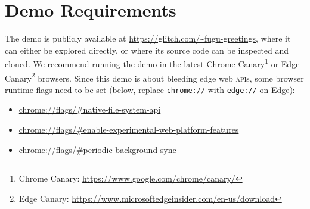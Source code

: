 \documentclass[sigconf]{acmart}
\begin{document}



\appendix

\section{Demo Requirements}

The demo is publicly available at \url{https://glitch.com/~fugu-greetings},
where it can either be explored directly,
or where its source code can be inspected and cloned.
We recommend running the demo in the latest Chrome
Canary\footnote{Chrome Canary: \url{https://www.google.com/chrome/canary/}}
or Edge
Canary\footnote{Edge Canary: \url{https://www.microsoftedgeinsider.com/en-us/download}}
browsers.
Since this demo is about bleeding edge web \textsc{api}s,
some browser runtime flags need to be set (below, replace \texttt{chrome://}
with \texttt{edge://} on Edge):

\begin{itemize}
  \item \url{chrome://flags/#native-file-system-api}
  \item \url{chrome://flags/#enable-experimental-web-platform-features}  
  \item \url{chrome://flags/#periodic-background-sync}
\end{itemize}
\end{document}
